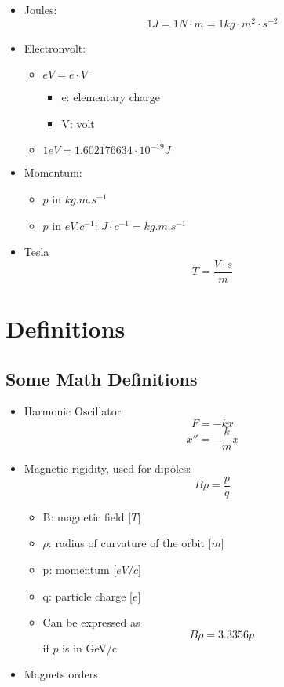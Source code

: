 \documentclass[openright,twoside,headsepline,bibliography=totoc]{scrbook}
\begin{document}
\begin{itemize}
\item
  Joules: \[1 J = 1 N \cdot m = 1 kg \cdot m^2 \cdot s^{-2}\]
\item
  Electronvolt:

  \begin{itemize}
  \tightlist
  \item
    \(eV = e \cdot V\)

    \begin{itemize}
    \tightlist
    \item
      e: elementary charge
    \item
      V: volt
    \end{itemize}
  \item
    \(1 eV = 1.602176634 \cdot 10^{-19} J\)
  \end{itemize}
\item
  Momentum:

  \begin{itemize}
  \tightlist
  \item
    \(p\) in \(kg.m.s^{-1}\)
  \item
    \(p\) in \(eV.c^{-1}\): \(J \cdot c^{-1} = kg.m.s^{-1}\)
  \end{itemize}
\item
  Tesla \[T = \frac{V \cdot s}{m}\]
\end{itemize}

\newpage

\hypertarget{definitions}{%
\section{Definitions}\label{definitions}}

\hypertarget{some-math-definitions}{%
\subsection{Some Math Definitions}\label{some-math-definitions}}

\begin{itemize}
\item
  Harmonic Oscillator \[F = -kx\] \[x'' = -\frac{k}{m}x \]
\item
  Magnetic rigidity, used for dipoles: \[B\rho = \frac{p}{q}\]

  \begin{itemize}
  \item
    B: magnetic field {[}\(T\){]}
  \item
    \(\rho\): radius of curvature of the orbit {[}\(m\){]}
  \item
    p: momentum {[}\(eV/c\){]}
  \item
    q: particle charge {[}\(e\){]}
  \item
    Can be expressed as \[B \rho = 3.3356 p\] if \(p\) is in GeV/c
  \end{itemize}
\item
  Magnets orders
\end{itemize}
\end{document}
